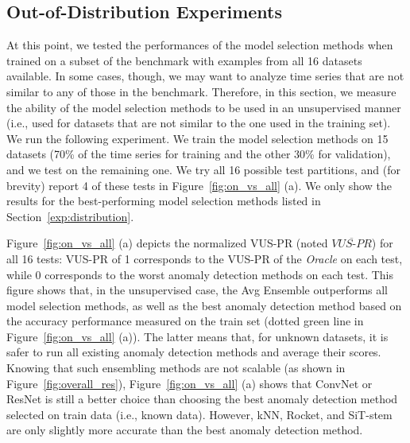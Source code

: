 \subsection{Out-of-Distribution Experiments}
\label{exp:sup2unsup}

At this point, we tested the performances of the model selection methods when trained on a subset of the benchmark with examples from all 16 datasets available. %
In some cases, though, we may want to analyze time series that are not similar to any of those in the benchmark. Therefore, in this section, we measure the ability of the model selection methods to be used in an unsupervised manner (i.e., used for datasets that are not similar to the one used in the training set). We run the following experiment. We train the model selection methods on 15 datasets (70\% of the time series for training and the other 30\% for validation), and we test on the remaining one. We try all 16 possible test partitions, and (for brevity) report 4 of these tests in Figure~\ref{fig:on_vs_all} (a). We only show the results for the best-performing model selection methods listed in Section~\ref{exp:distribution}. %

Figure~\ref{fig:on_vs_all} (a) depicts the normalized VUS-PR (noted $\overline{VUS\text{-}PR}$) for all 16 tests: VUS-PR of 1 corresponds to the VUS-PR of the \emph{Oracle} on each test, while 0 corresponds to the worst anomaly detection methods on each test. This figure shows that, in the unsupervised case, the Avg Ensemble outperforms all model selection methods, as well as the best anomaly detection method based on the accuracy performance measured on the train set (dotted green line in Figure~\ref{fig:on_vs_all} (a)). The latter means that, for unknown datasets, it is safer to run all existing anomaly detection methods and average their scores. Knowing that such ensembling methods are not scalable (as shown in Figure~\ref{fig:overall_res}), Figure~\ref{fig:on_vs_all} (a) shows that ConvNet or ResNet is still a better choice than choosing the best anomaly detection method selected on train data (i.e., known data). However, kNN, Rocket, and SiT-stem are only slightly more accurate than the best anomaly detection method.

